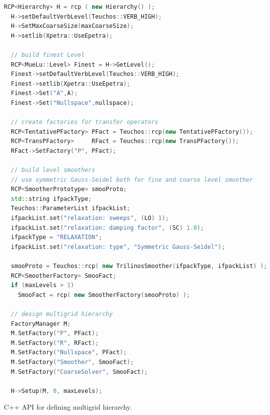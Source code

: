 \documentclass[12pt,a4paper]{article}
\begin{document}
\begin{Listing}
\begin{center}
\begin{lstlisting}[language=c++]
  RCP<Hierarchy> H = rcp ( new Hierarchy() );
  H->setDefaultVerbLevel(Teuchos::VERB_HIGH);
  H->SetMaxCoarseSize(maxCoarseSize);
  H->setlib(Xpetra::UseEpetra);

  // build finest Level
  RCP<MueLu::Level> Finest = H->GetLevel();
  Finest->setDefaultVerbLevel(Teuchos::VERB_HIGH);
  Finest->setlib(Xpetra::UseEpetra);
  Finest->Set("A",A);
  Finest->Set("Nullspace",nullspace);

  // create factories for transfer operators
  RCP<TentativePFactory> PFact = Teuchos::rcp(new TentativePFactory());
  RCP<TransPFactory>     RFact = Teuchos::rcp(new TransPFactory());
  RFact->SetFactory("P", PFact);

  // build level smoothers
  // use symmetric Gauss-Seidel both for fine and coarse level smoother
  RCP<SmootherPrototype> smooProto;
  std::string ifpackType;
  Teuchos::ParameterList ifpackList;
  ifpackList.set("relaxation: sweeps", (LO) 1);
  ifpackList.set("relaxation: damping factor", (SC) 1.0);
  ifpackType = "RELAXATION";
  ifpackList.set("relaxation: type", "Symmetric Gauss-Seidel");

  smooProto = Teuchos::rcp( new TrilinosSmoother(ifpackType, ifpackList) );
  RCP<SmootherFactory> SmooFact;
  if (maxLevels > 1)
    SmooFact = rcp( new SmootherFactory(smooProto) );

  // design multigrid hierarchy
  FactoryManager M;
  M.SetFactory("P", PFact);
  M.SetFactory("R", RFact);
  M.SetFactory("Nullspace", PFact);
  M.SetFactory("Smoother", SmooFact);
  M.SetFactory("CoarseSolver", SmooFact);

  H->Setup(M, 0, maxLevels);
\end{lstlisting}
\caption{C++ API for defining multigrid hierarchy.} 
\label{listing:CppAPI}
\end{center}
\end{Listing}
\end{document}
